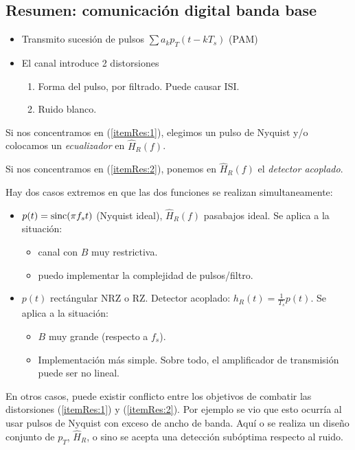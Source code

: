 

\subsection*{Resumen: comunicación digital banda base}
\begin{figure}[htb]
    \centering
    \resizebox{\textwidth}{!}{%
    
    }
\end{figure}
\FloatBarrier

\begin{itemize}
 \item Transmito sucesión de pulsos $\sum a_k p_T(t-kT_s)$ (PAM)
 \item El canal introduce 2 distorsiones
\begin{enumerate}
  \renewcommand{\theenumi}{\roman{enumi}}
  \item \label{itemRes:1}Forma del pulso, por filtrado. Puede causar ISI.

  \item \label{itemRes:2}Ruido blanco.
\end{enumerate}
\end{itemize}

Si nos concentramos en (\ref{itemRes:1}), elegimos un pulso de
Nyquist y/o colocamos un \emph{ecualizador} en $\hat{H}_R(f)$.

Si nos concentramos en (\ref{itemRes:2}), ponemos en
$\hat{H}_R(f)$ el \emph{detector acoplado}.

Hay dos casos extremos en que las dos funciones se realizan
simultaneamente:

\begin{itemize}
 \item $p(t) = \operatorname{sinc}(\pi f_s t)$ (Nyquist ideal), $\hat{H}_R(f)$ pasabajos ideal. Se aplica a la situación:
    \begin{itemize}
     \item canal con $B$ muy restrictiva.
     \item puedo implementar la complejidad de pulsos/filtro.
    \end{itemize}
 \item $p(t)$ rectángular NRZ o RZ. Detector acoplado: $h_R(t) = \frac{1}{T_s}p(t)$. Se aplica a la situación:
\begin{itemize}
 \item $B$ muy grande (respecto a $f_s$).
  \item Implementación más simple. Sobre todo, el amplificador de transmisión puede ser no lineal.
\end{itemize}
\end{itemize}

En otros casos, puede existir conflicto entre los objetivos de
combatir las distorsiones (\ref{itemRes:1}) y (\ref{itemRes:2}).
Por ejemplo se vio que esto ocurría al usar pulsos de Nyquist con
exceso de ancho de banda. Aquí o se realiza un diseño conjunto de
$p_T$, $\hat{H}_R$, o sino se acepta una detección subóptima
respecto al ruido.

